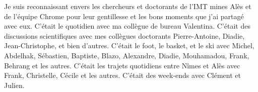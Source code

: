 Je suis reconnaissant envers les chercheurs et doctorants de l'IMT mines Alès et de l'équipe Chrome pour leur gentillesse et les bons moments que j'ai partagé avec eux. C'était le quotidien avec ma collègue de bureau Valentina. C'était des discussions scientifiques avec mes collègues doctorants Pierre-Antoine, Diadie, Jean-Christophe, et bien d'autres. C'était le foot, le basket, et le ski avec Michel, Abdelhak, Sébastien, Baptiste, Blazo, Alexandre, Diadie, Mouhamadou, Frank, Behrang et les autres. C'était les trajets quotidiens entre Nîmes et Alès avec Frank, Christelle, Cécile et les autres. C'était des week-ends avec Clément et Julien.

